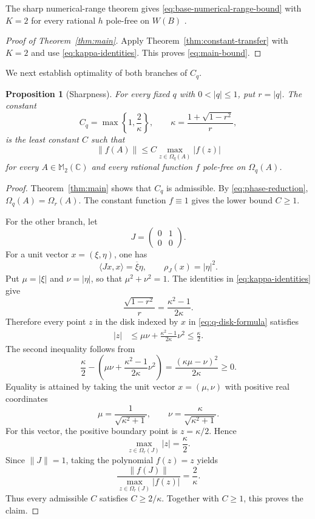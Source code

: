 \documentclass[preprints,article,submit,oneauthor]{Definitions/mdpi}
\newcounter{manuscriptresult}[section]
\theoremstyle{mdpi}
\newtheorem{proposition}[manuscriptresult]{Proposition}
\theoremstyle{definition}
\newcommand{\C}{\mathbb C}
\begin{document}
The sharp numerical-range theorem gives
\eqref{eq:base-numerical-range-bound} with $K=2$ for every rational
$h$ pole-free on $W(B)$ \cite{Jin2026}.

\begin{proof}[Proof of Theorem~\ref{thm:main}]
Apply Theorem~\ref{thm:constant-transfer} with $K=2$ and use
\eqref{eq:kappa-identities}.  This proves \eqref{eq:main-bound}.
\end{proof}

We next establish optimality of both branches of $C_q$.

\begin{proposition}[Sharpness]
\label{prop:sharpness}
For every fixed $q$ with $0<\lvert q\rvert\leq1$, put
$r=\lvert q\rvert$.  The constant
\[
 C_q=\max\left\{1,\frac2\kappa\right\},
 \qquad
 \kappa=\frac{1+\sqrt{1-r^2}}r,
\]
is the least constant $C$ such that
\[
 \lVert f(A)\rVert
 \leq C\max_{z\in\Omega_q(A)}\lvert f(z)\rvert
\]
for every $A\in\mathbb M_2(\C)$ and every rational function $f$
pole-free on $\Omega_q(A)$.
\end{proposition}

\begin{proof}
Theorem~\ref{thm:main} shows that $C_q$ is admissible.  By
\eqref{eq:phase-reduction}, $\Omega_q(A)=\Omega_r(A)$.  The constant
function $f\equiv1$ gives the lower bound $C\geq1$.

For the other branch, let
\[
 J=\begin{pmatrix}0&1\\0&0\end{pmatrix}.
\]
For a unit vector $x=(\xi,\eta)$, one has
\[
 \langle Jx,x\rangle=\overline\xi\eta,
 \qquad
 \rho_J(x)=\lvert\eta\rvert^2.
\]
Put $\mu=\lvert\xi\rvert$ and $\nu=\lvert\eta\rvert$, so that
$\mu^2+\nu^2=1$.  The identities in \eqref{eq:kappa-identities} give
\[
 \frac{\sqrt{1-r^2}}r=\frac{\kappa^2-1}{2\kappa}.
\]
Therefore every point $z$ in the disk indexed by $x$ in
\eqref{eq:q-disk-formula} satisfies
\begin{align*}
 \lvert z\rvert
 &\leq \mu\nu+\frac{\kappa^2-1}{2\kappa}\nu^2
 \leq\frac\kappa2.
\end{align*}
The second inequality follows from
\begin{equation}
 \frac\kappa2-
 \left(\mu\nu+\frac{\kappa^2-1}{2\kappa}\nu^2\right)
 =\frac{(\kappa\mu-\nu)^2}{2\kappa}\geq0.
 \label{eq:jordan-disk-bound}
\end{equation}
Equality is attained by taking the unit vector $x=(\mu,\nu)$ with
positive real coordinates
\[
 \mu=\frac1{\sqrt{\kappa^2+1}},
 \qquad
 \nu=\frac\kappa{\sqrt{\kappa^2+1}}.
\]
For this vector, the positive boundary point is $z=\kappa/2$.  Hence
\[
 \max_{z\in\Omega_r(J)}\lvert z\rvert=\frac\kappa2.
\]
Since $\lVert J\rVert=1$, taking the polynomial $f(z)=z$ yields
\[
 \frac{\lVert f(J)\rVert}
 {\max_{z\in\Omega_r(J)}\lvert f(z)\rvert}
 =\frac2\kappa.
\]
Thus every admissible $C$ satisfies $C\geq2/\kappa$.  Together with
$C\geq1$, this proves the claim.
\end{proof}
\end{document}
